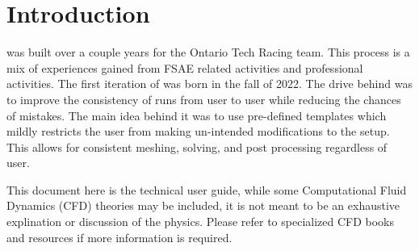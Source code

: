\section{Introduction}
 was built over a couple years for the Ontario Tech Racing team. This process is a mix of experiences gained from FSAE related activities and professional activities. The first iteration of  was born in the fall of 2022. The drive behind  was to improve the consistency of runs from user to user while reducing the chances of mistakes. The main idea behind it was to use pre-defined templates which mildly restricts the user from making un-intended modifications to the setup. This allows for consistent meshing, solving, and post processing regardless of user. 

This document here is the technical user guide, while some Computational Fluid Dynamics (CFD) theories may be included, it is not meant to be an exhaustive explination or discussion of the physics. Please refer to specialized CFD books and resources if more information is required.



